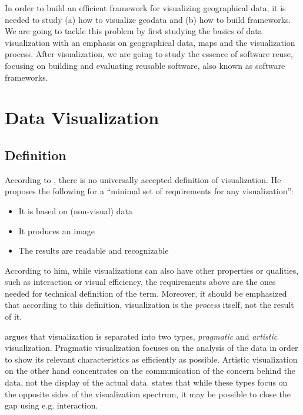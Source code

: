 

In order to build an efficient framework for visualizing geographical data, it is needed to study (a) how to visualize geodata and (b) how to build frameworks. We are going to tackle this problem by first studying the basics of data visualization with an emphasis on geographical data, maps and the visualization process. After visualization, we are going to study the essence of software reuse, focusing on building and evaluating reusable software, also known as software frameworks.

\chapter{Data Visualization}
\label{chapter:dataviz}

\section{Definition}

According to \citet[chap.~3]{kosara_visualization_2007}, there is no universally accepted definition of visualization. He proposes the following for a ``minimal set of requirements for any visualization'':

\begin{itemize}
	\item It is based on (non-visual) data
	\item It produces an image
	\item The results are readable and recognizable
\end{itemize}

According to him, while visualizations can also have other properties or qualities, such as interaction or visual efficiency, the requirements above are the ones needed for technical definition of the term. Moreover, it should be emphasized that according to this definition, visualization is the \emph{process} itself, not the result of it.

\citet[chap.~4]{kosara_visualization_2007} argues that visualization is separated into two types, \emph{pragmatic} and \emph{artistic} visualization. Pragmatic visualization focuses on the analysis of the data in order to show its relevant characteristics as efficiently as possible. Artistic visualization on the other hand concentrates on the communication of the concern behind the data, not the display of the actual data. \citeauthor{kosara_visualization_2007} states that while these types focus on the opposite sides of the visualization spectrum, it may be possible to close the gap using e.g. interaction.

